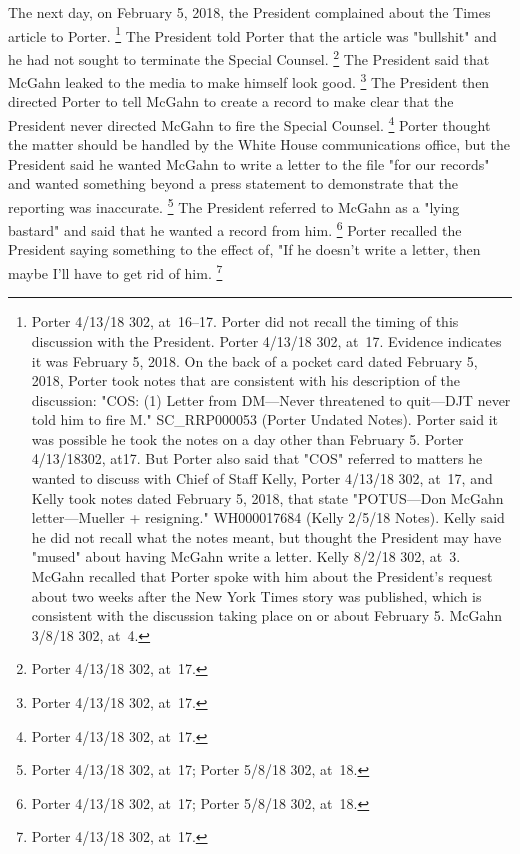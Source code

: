 {The next day, on February 5, 2018, the President complained about the Times article to Porter.%
\footnote{Porter 4/13/18 302, at~16--17.
Porter did not recall the timing of this discussion with the President.
Porter 4/13/18 302, at~17.
Evidence indicates it was February 5, 2018.
On the back of a pocket card dated February 5, 2018, Porter took notes that are consistent with his description of the discussion: "COS: (1) Letter from DM---Never threatened to quit---DJT never told him to fire M."
SC\_RRP000053 (Porter Undated Notes).
Porter said it was possible he took the notes on a day other than February 5.
Porter 4/13/18302, at17.
But Porter also said that "COS" referred to matters he wanted to discuss with Chief of Staff Kelly, Porter 4/13/18 302, at~17, and Kelly took notes dated February 5, 2018, that state "POTUS---Don McGahn letter---Mueller + resigning."
WH000017684 (Kelly 2/5/18 Notes).
Kelly said he did not recall what the notes meant, but thought the President may have "mused" about having McGahn write a letter.
Kelly 8/2/18 302, at~3.
McGahn recalled that Porter spoke with him about the President's request about two weeks after the New York Times story was published, which is consistent with the discussion taking place on or about February 5.
McGahn 3/8/18 302, at~4.}
The President told Porter that the article was "bullshit" and he had not sought to terminate the Special Counsel.%
\footnote{Porter 4/13/18 302, at~17.}
The President said that McGahn leaked to the media to make himself look good.%
\footnote{Porter 4/13/18 302, at~17.}
The President then directed Porter to tell McGahn to create a record to make clear that the President never directed McGahn to fire the Special Counsel.%
\footnote{Porter 4/13/18 302, at~17.}
Porter thought the matter should be handled by the White House communications office, but the President said he wanted McGahn to write a letter to the file "for our records" and wanted something beyond a press statement to demonstrate that the reporting was inaccurate.%
\footnote{Porter 4/13/18 302, at~17;
Porter 5/8/18 302, at~18.}
The President referred to McGahn as a "lying bastard" and said that he wanted a record from him.%
\footnote{Porter 4/13/18 302, at~17;
Porter 5/8/18 302, at~18.}
Porter recalled the President saying something to the effect of, "If he doesn't write a letter, then maybe I'll have to get rid of him.%
\footnote{Porter 4/13/18 302, at~17.}

}
